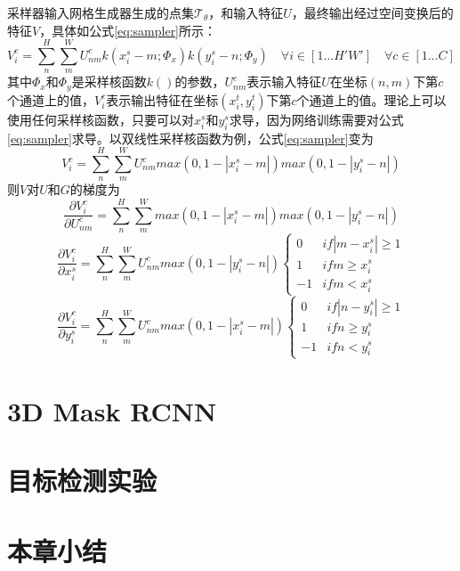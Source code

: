 采样器输入网格生成器生成的点集$\mathcal{T}_\theta$，和输入特征$U$，最终输出经过空间变换后的特征$V$，具体如公式\ref{eq:sampler}所示：
\begin{equation}
  \label{eq:sampler}
  V_i^c = \sum_n^H\sum_m^W{U_{nm}^ck(x_i^s-m;\Phi_x)k(y_i^s-n;\Phi_y)}\quad \forall i\in[1\ldots H'W']\quad \forall c\in[1\ldots C]
\end{equation}
其中$\Phi_{x}$和$\Phi_{y}$是采样核函数$k()$的参数，$U_{nm}^c$表示输入特征$U$在坐标$(n, m)$下第$c$个通道上的值，$V_i^c$表示输出特征在坐标$(x_i^t,y_i^t)$下第$c$个通道上的值。理论上可以使用任何采样核函数，只要可以对$x_i^s$和$y_i^s$求导，因为网络训练需要对公式\ref{eq:sampler}求导。以双线性采样核函数为例，公式\ref{eq:sampler}变为
\begin{equation}
  V_i^c = \sum_n^H\sum_m^W{U_{nm}^cmax(0, 1-|x_i^s-m|)max(0, 1-|y_i^s-n|)}
\end{equation}
则$V$对$U$和$G$的梯度为
\begin{equation}
  \frac{\partial V_i^c}{\partial U_{nm}^c} = \sum_n^H\sum_m^W{max(0, 1-|x_i^s-m|)max(0, 1-|y_i^s-n|)}
\end{equation}
\begin{equation}
  \frac{\partial V_i^c}{\partial x_i^s} = \sum_n^H\sum_m^W{U_{nm}^cmax(0, 1-|y_i^s-n|)}
  \left\{
      \begin{array}{ll}
        0&if|m-x_i^s| \geq 1\\
        1&if m \geq x_i^s\\
        -1&if m < x_i^s
      \end{array}
    \right.
\end{equation}
\begin{equation}
  \frac{\partial V_i^c}{\partial y_i^s} = \sum_n^H\sum_m^W{U_{nm}^cmax(0, 1-|x_i^s-m|)}
  \left\{
      \begin{array}{ll}
        0&if|n-y_i^s| \geq 1\\
        1&if n \geq y_i^s\\
        -1&if n < y_i^s
      \end{array}
    \right.
\end{equation}


\section{3D Mask RCNN}

\section{目标检测实验}

\section{本章小结}

